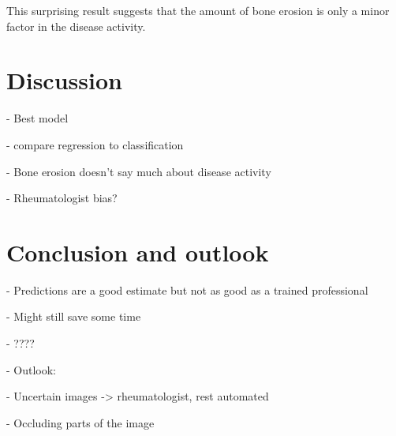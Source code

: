 \documentclass[12pt]{article}
\begin{document}
This surprising result suggests that the amount of bone erosion is only a minor factor in the disease activity. 

\newpage
\section{Discussion}
\label{sec:discussion}

- Best model

- compare regression to classification

- Bone erosion doesn't say much about disease activity

- Rheumatologist bias?


\newpage
\section{Conclusion and outlook}
\label{sec:conclusion}

- Predictions are a good estimate but not as good as a trained professional

- Might still save some time

- ????

- Outlook: 

- Uncertain images -> rheumatologist, rest automated

- Occluding parts of the image
 


\newpage
\printbibliography

\newpage
\listoffigures
\end{document}
